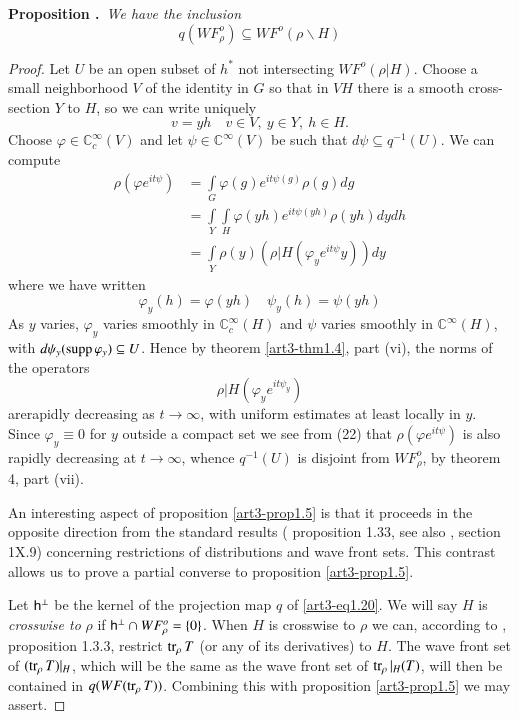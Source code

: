 \medskip
\noindent
{\bf Proposition .\label{art3-prop1.5}}~{\em We have the inclusion}
\begin{equation*}
q(WF^{o}_{\rho})\subseteq WF^{o}(\rho\backslash H)\tag{1.21}\label{art3-eq1.21}
\end{equation*}

\begin{proof}
Let $U$ be an open subset of $h^{*}$ not intersecting $WF^{o}(\rho|H)$. Choose a small neighborhood $V$ of the identity in $G$ so that in $VH$ there is a smooth cross-section $Y$ to $H$, so we can write uniquely
$$
v=yh\quad v\in V, \ y\in Y, \ h\in H.
$$
Choose $\varphi\in \mathbb{C}^{\infty}_{c}(V)$ and let $\psi\in \mathbb{C}^{\infty}(V)$ be such that $d\psi\subseteq q^{-1}(U)$. We can compute
\begin{align*}
\rho(\varphi e^{it\psi}) &= \int\limits_{G}\varphi(g)e^{it\psi(g)}\rho(g)dg\tag{1.22}\label{art3-eq1.22}\\[4pt]
&= \int\limits_{Y}\int\limits_{H}\varphi(yh)e^{it\psi(yh)}\rho(yh)dydh\\[4pt]
&= \int\limits_{Y}\rho(y)\left(\rho|H(\varphi_{y}e^{it\psi}y)\right)dy
\end{align*}
where we have written
$$
\varphi_{y}(h)=\varphi(yh)\quad \psi_{y}(h)=\psi(yh)
$$
As $y$ varies, $\varphi_{y}$ varies smoothly in $\mathbb{C}^{\infty}_{c}(H)$ and $\psi$ varies smoothly in $\mathbb{C}^{\infty}(H)$, with $d\psi_{y}(\operatorname{supp} \varphi_{y})\subseteq U$. Hence by theorem \ref{art3-thm1.4}, part (vi), the norms of the operators
$$
\rho|H(\varphi_{y}e^{it\psi_{y}})
$$
are\pageoriginale rapidly decreasing as $t\to \infty$, with uniform estimates at least locally in $y$. Since $\varphi_{y}\equiv 0$ for $y$ outside a compact set we see from (22) that $\rho(\varphi e^{it\psi})$ is also rapidly decreasing at $t\to \infty$, whence $q^{-1}(U)$ is disjoint from $WF^{o}_{\rho}$, by theorem 4, part (vii).

An interesting aspect of proposition \ref{art3-prop1.5} is that it proceeds in the opposite direction from the standard results (\cite{art3-D} proposition 1.33, see also \cite{3-R-S}, section 1X.9) concerning restrictions of distributions and wave front sets. This contrast allows us to prove a partial converse to proposition \ref{art3-prop1.5}.

Let $\mathsf{h}^{\perp}$ be the kernel of the projection map $q$ of \eqref{art3-eq1.20}. We will say $H$ is {\em crosswise to} $\rho$ if $\mathsf{h}^{\perp}\cap WF^{o}_{\rho}=\{0\}$. When $H$ is crosswise to $\rho$ we can, according to \cite{art3-D}, proposition 1.3.3, restrict $\operatorname{tr}_{\rho}T$ (or any of its derivatives) to $H$. The wave front set of $(\operatorname{tr}_{\rho}T)|_{H}$, which will be the same as the wave front set of $\operatorname{tr}_{\rho}|_{H}(T)$, will then be contained in $q(WF(\operatorname{tr}_{\rho}T))$. Combining this with proposition \ref{art3-prop1.5} we may assert.
\end{proof}

